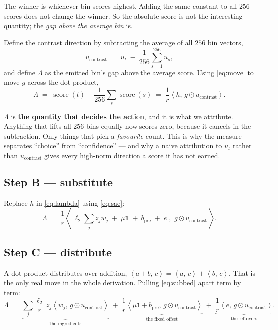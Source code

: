 \documentclass[11pt]{article}
\newcommand{\dotp}[2]{\left\langle #1,\, #2 \right\rangle}
\newcommand{\ucon}{u_{\mathrm{contrast}}}
\newcommand{\bpre}{b_{\mathrm{pre}}}
\begin{document}
The winner is whichever bin scores highest. Adding the same constant to all $256$ scores does
not change the winner. So the absolute score is not the interesting quantity; the \emph{gap
above the average bin} is.

Define the contrast direction by subtracting the average of all $256$ bin vectors,
\begin{equation}
\ucon \;=\; u_t \;-\; \frac{1}{256}\sum_{s=1}^{256} u_s ,
\label{eq:ucon}
\end{equation}
and define $\Lambda$ as the emitted bin's gap above the average score. Using \eqref{eq:move} to
move $g$ across the dot product,
\begin{equation}
\Lambda \;=\; \operatorname{score}(t) - \frac{1}{256}\sum_{s}\operatorname{score}(s)
        \;=\; \frac{1}{r}\dotp{h}{g \odot \ucon}.
\label{eq:lambda}
\end{equation}

$\Lambda$ is \textbf{the quantity that decides the action}, and it is what we attribute.
Anything that lifts all $256$ bins equally now scores zero, because it cancels in the
subtraction. Only things that pick a \emph{favourite} count. This is why the measure separates
``choice'' from ``confidence'' --- and why a naive attribution to $u_t$ rather than $\ucon$
gives every high-norm direction a score it has not earned.

\subsection*{Step B --- substitute}

Replace $h$ in \eqref{eq:lambda} using \eqref{eq:sae}:
\begin{equation}
\Lambda \;=\; \frac{1}{r}\dotp{\;\ell_2 \sum_j z_j w_j \;+\; \mu\mathbf{1} \;+\; \bpre \;+\; e\;}{\,g \odot \ucon\,}.
\label{eq:subbed}
\end{equation}

\subsection*{Step C --- distribute}

A dot product distributes over addition, $\dotp{a+b}{c} = \dotp{a}{c} + \dotp{b}{c}$. That is
the only real move in the whole derivation. Pulling \eqref{eq:subbed} apart term by term:
\begin{equation}
\Lambda \;=\;
\underbrace{\sum_{j} \frac{\ell_2}{r}\, z_j \dotp{w_j}{g \odot \ucon}}_{\text{the ingredients}}
\;+\;
\underbrace{\frac{1}{r}\dotp{\mu\mathbf{1} + \bpre}{g \odot \ucon}}_{\text{the fixed offset}}
\;+\;
\underbrace{\frac{1}{r}\dotp{e}{g \odot \ucon}}_{\text{the leftovers}} .
\label{eq:decomp}
\end{equation}
\end{document}
